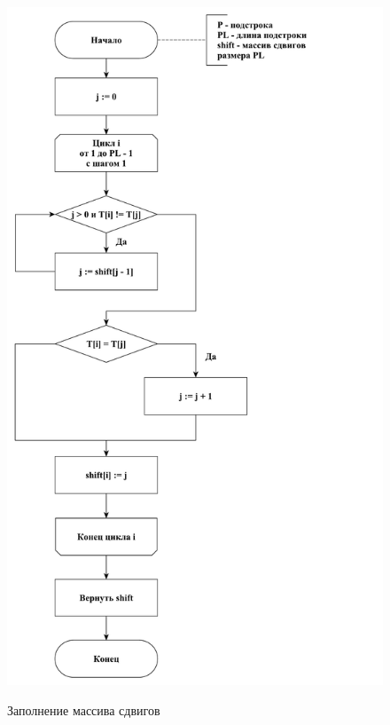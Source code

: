 \documentclass[a4paper,12pt]{article}
\begin{document}
\begin{figure}[h!]
	\begin{center}
		{\includegraphics[scale = 0.4]{shift.pdf}}
		\caption{
			Заполнение массива сдвигов}
		\label{fig:shift}
	\end{center}
\end{figure}

\pagebreak
\end{document}
